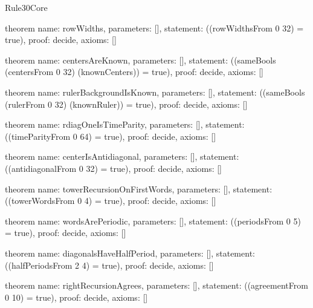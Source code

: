 \begin{lexlean}{Rule30Core}
\begin{semanticmodule}
theorem{
  name: rowWidths,
  parameters: [],
  statement: ((rowWidthsFrom 0 32) = true),
  proof: decide{},
  axioms: []
}

theorem{
  name: centersAreKnown,
  parameters: [],
  statement: ((sameBools (centersFrom 0 32) (knownCenters)) = true),
  proof: decide{},
  axioms: []
}

theorem{
  name: rulerBackgroundIsKnown,
  parameters: [],
  statement: ((sameBools (rulerFrom 0 32) (knownRuler)) = true),
  proof: decide{},
  axioms: []
}

theorem{
  name: rdiagOneIsTimeParity,
  parameters: [],
  statement: ((timeParityFrom 0 64) = true),
  proof: decide{},
  axioms: []
}

theorem{
  name: centerIsAntidiagonal,
  parameters: [],
  statement: ((antidiagonalFrom 0 32) = true),
  proof: decide{},
  axioms: []
}

theorem{
  name: towerRecursionOnFirstWords,
  parameters: [],
  statement: ((towerWordsFrom 0 4) = true),
  proof: decide{},
  axioms: []
}

theorem{
  name: wordsArePeriodic,
  parameters: [],
  statement: ((periodsFrom 0 5) = true),
  proof: decide{},
  axioms: []
}

theorem{
  name: diagonalsHaveHalfPeriod,
  parameters: [],
  statement: ((halfPeriodsFrom 2 4) = true),
  proof: decide{},
  axioms: []
}

theorem{
  name: rightRecursionAgrees,
  parameters: [],
  statement: ((agreementFrom 0 10) = true),
  proof: decide{},
  axioms: []
}
\end{semanticmodule}
\end{lexlean}
